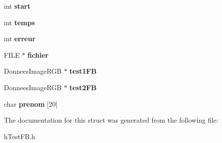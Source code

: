 \begin{DoxyCompactItemize}
\item 
int {\bfseries start}\hypertarget{structtestFB_aac9d3e0a5715c139234b32c99674b7f5}{}\label{structtestFB_aac9d3e0a5715c139234b32c99674b7f5}

\item 
int {\bfseries temps}\hypertarget{structtestFB_a083d19395309503e328224aa35646a8e}{}\label{structtestFB_a083d19395309503e328224aa35646a8e}

\item 
int {\bfseries erreur}\hypertarget{structtestFB_ae27714bfada1c6176b1af512491dbd00}{}\label{structtestFB_ae27714bfada1c6176b1af512491dbd00}

\item 
F\+I\+LE $\ast$ {\bfseries fichier}\hypertarget{structtestFB_a01c630238bb34a5c67ef08ece202b178}{}\label{structtestFB_a01c630238bb34a5c67ef08ece202b178}

\item 
Donnees\+Image\+R\+GB $\ast$ {\bfseries test1\+FB}\hypertarget{structtestFB_aa30ded6b44a96238652680412a3c2f75}{}\label{structtestFB_aa30ded6b44a96238652680412a3c2f75}

\item 
Donnees\+Image\+R\+GB $\ast$ {\bfseries test2\+FB}\hypertarget{structtestFB_a42c97c44463c946d8112f72736bb2fc5}{}\label{structtestFB_a42c97c44463c946d8112f72736bb2fc5}

\item 
char {\bfseries prenom} \mbox{[}20\mbox{]}\hypertarget{structtestFB_abc1010cb9ea68c3a6f4198c8f5cc8446}{}\label{structtestFB_abc1010cb9ea68c3a6f4198c8f5cc8446}

\end{DoxyCompactItemize}


The documentation for this struct was generated from the following file\+:\begin{DoxyCompactItemize}
\item 
h\+Test\+F\+B.\+h\end{DoxyCompactItemize}
